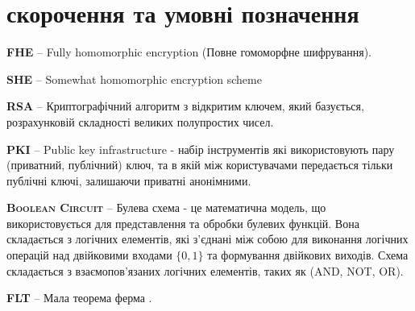 \newpage
\chapter*{скорочення та умовні позначення}

\textbf{\textsc{FHE}} -- Fully homomorphic encryption (Повне гомоморфне шифрування).

\textbf{\textsc{SHE}} -- Somewhat homomorphic encryption scheme

\textbf{\textsc{RSA}} -- Криптографічний алгоритм з відкритим ключем, який базується,
розрахунковій складності великих полупростих чисел.

\textbf{\textsc{PKI}} -- Public key infrastructure - набір інструментів які
використовують пару (приватний, публічний) ключ, та в якій між користувачами
передається тільки публічні ключі, залишаючи приватні анонімними.

\textbf{\textsc{Boolean Circuit}} -- Булева схема - це математична модель, що
використовується для представлення та обробки булевих функцій. Вона складається з логічних
елементів, які з'єднані між собою для виконання логічних операцій над двійковими входами
\(\{0,1\}\) та формування двійкових виходів. Схема складається з взаємопов'язаних логічних
елементів, таких як (AND, NOT, OR). 


\textbf{\textsc{FLT}} -- Мала теорема ферма \cite{Fermat}.
